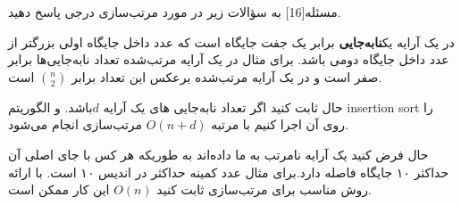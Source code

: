 ‌مسئله[16]
به سؤالات زیر در مورد مرتب‌سازی درجی پاسخ دهید.




در یک آرایه یک\textbf{نابه‌جایی}
برابر یک جفت جایگاه است که عدد داخل جایگاه اولی بزرگتر از عدد داخل جایگاه دومی باشد.
برای مثال در یک آرایه مرتب‌شده تعداد نابه‌جایی‌ها برابر صفر است و در یک آرایه مرتب‌شده برعکس این تعداد برابر 
$\binom{n}{2}$
است.

حال ثابت کنید اگر تعداد نابه‌جایی های یک آرایه $d$باشد.
و الگوریتم 
insertion sort
را روی آن اجرا کنیم با مرتبه
$O(n + d)$
مرتب‌سازی انجام می‌شود.


حال فرض کنید یک آرایه نامرتب به ما داده‌اند به طوریکه هر کس با جای اصلی آن حداکثر ۱۰ جایگاه فاصله دارد.برای مثال عدد کمینه حداکثر در اندیس ۱۰ است.
با ارائه روش مناسب برای مرتب‌سازی ثابت کنید 
$O(n)$
این کار ممکن است.












